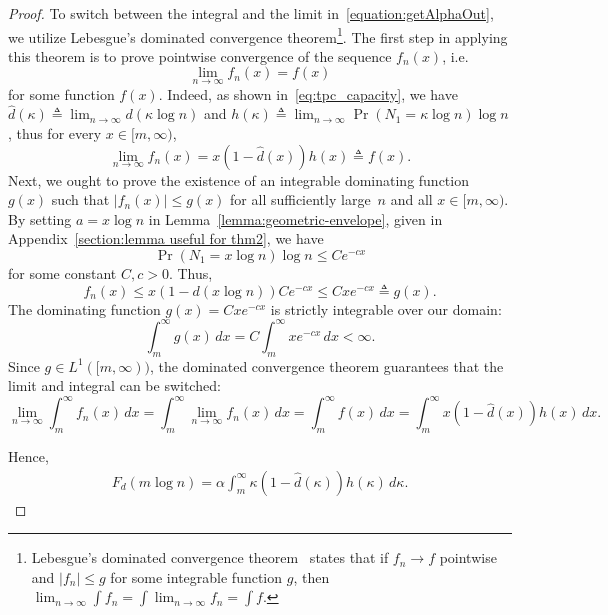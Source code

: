 \documentclass[journal,letterpaper,onecolumn,11pt]{IEEEtran}
\begin{document}
\begin{proof}
To switch between the integral and the limit in~\eqref{equation:getAlphaOut}, we utilize Lebesgue's dominated convergence theorem\footnote{Lebesgue's dominated convergence theorem~\cite{wiki:Dominated_convergence_theorem} states that if $f_n \to f$ pointwise and $|f_n|\le g$ for some integrable function $g$, then $\lim_{n\to\infty}\int f_n
=
\int \lim_{n\to\infty} f_n
=
\int f$.
}. %
The first step in applying this theorem is to prove pointwise convergence of the sequence $f_n(x)$, i.e. $$\lim_{n\to\infty}f_n(x)=f(x)$$
for some function $f(x)$.
Indeed, as shown in~\eqref{eq:tpc_capacity}, we have $\hat{d}(\kappa) \triangleq \lim_{n \to \infty} d(\kappa \log n)$ and 
\(h(\kappa)\triangleq \lim_{n \to \infty}\Pr(N_1=\kappa\log n)\log n\), thus for every $x\in [m,\infty)$, $$\lim_{n\to\infty}f_n(x) = x (1 - \hat{d}(x)) h(x)\triangleq f(x).$$ 
Next, we ought to prove the existence of an integrable dominating function $g(x)$ such that $|f_n(x)|\le g(x)$ for all sufficiently large~$n$ and all $x\in[m,\infty)$.
By setting $a=x \log n$ in Lemma~\ref{lemma:geometric-envelope}, given in Appendix~\ref{section:lemma useful for thm2}, we have $$\Pr(N_1=x\log n)\log n\le Ce^{-cx}$$ for some constant $C,c>0$.
Thus, $$f_n(x)\le x(1-d(x\log n))Ce^{-cx}\le Cxe^{-cx}\triangleq g(x).$$
The dominating function $g(x) = C x e^{-c x}$ is strictly integrable over our domain:$$\int_m^\infty g(x) \, dx = C \int_m^\infty x e^{-c x} \, dx < \infty.$$
Since $g \in L^1([m, \infty))$, the dominated convergence theorem guarantees that the limit and integral can be switched: $$\lim_{n\to\infty} \int_m^\infty f_n(x) \, dx = \int_m^\infty \lim_{n\to\infty}f_n(x) \, dx= \int_m^\infty f(x) \, dx = \int_m^\infty x (1 - \hat{d}(x)) h(x) \, dx.$$

Hence,
\begin{align}\label{equation:R_er}
        F_d(m\log n)
    =
    \alpha
    \int_m^\infty
    \kappa(1-\hat d(\kappa))h(\kappa)\,d\kappa.
\end{align}





\end{proof}
\end{document}
